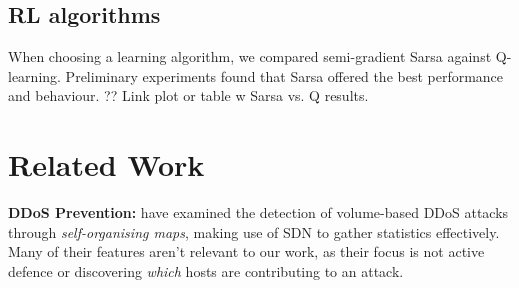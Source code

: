 \documentclass[10pt, times, conference, letterpaper]{IEEEtran}
\newcommand{\fakepara}[1]{\noindent\textbf{#1:}}
\begin{document}
%

\subsection{RL algorithms}
When choosing a learning algorithm, we compared semi-gradient Sarsa against Q-learning.
Preliminary experiments found that Sarsa offered the best performance and behaviour.
?? Link plot or table w Sarsa vs. Q results.

\section{Related Work}\label{sec:related-work}


\fakepara{DDoS Prevention}
\Textcite{DBLP:conf/lcn/BragaMP10} have examined the detection of volume-based DDoS attacks through \emph{self-organising maps}, making use of SDN to gather statistics effectively.
Many of their features aren't relevant to our work, as their focus is not active defence or discovering \emph{which} hosts are contributing to an attack.
\end{document}
